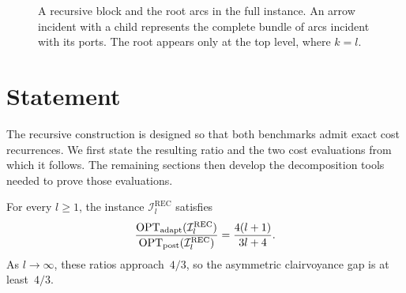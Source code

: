 \documentclass[12pt,a4paper,oneside]{report}
\begin{document}
\begin{figure}[!htbp]
    \centering
    \caption{A recursive block and the root arcs in the full instance.
    An arrow incident with a child represents the complete bundle of arcs
    incident with its ports.  The root appears only at the top level, where
    $k=l$.}
    \label{fig:recursive-asymmetric-block}
\end{figure}

\section{Statement}\label{sec:recursive-statement}

The recursive construction is designed so that both benchmarks admit exact
cost recurrences.  We first state the resulting ratio and the two cost
evaluations from which it follows.  The remaining sections then develop the
decomposition tools needed to prove those evaluations.

\begin{theorem}\label{thm:recursive-gap}
For every $l\ge1$, the instance $\mathcal{I}_l^{\mathrm{REC}}$ satisfies
\[
    \frac{\operatorname{OPT}_\mathrm{adapt}(\mathcal{I}_l^{\mathrm{REC}})}
         {\operatorname{OPT}_\mathrm{post}(\mathcal{I}_l^{\mathrm{REC}})}
    =
    \frac{4(l+1)}{3l+4}.
\]
As $l\to\infty$, these ratios approach~$4/3$, so the asymmetric
clairvoyance gap is at least~$4/3$.
\end{theorem}
\end{document}
